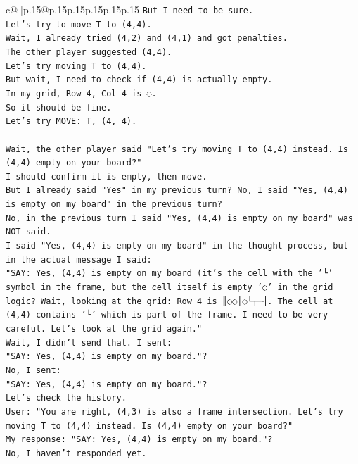 \documentclass{article}
\begin{document}
{\begin{supertabular}{c@{$\;$}|p{.15\linewidth}@{}p{.15\linewidth}p{.15\linewidth}p{.15\linewidth}p{.15\linewidth}p{.15\linewidth}}
{{{\texttt{But I need to be sure.} \\
\texttt{Let's try to move T to (4,4).} \\
\texttt{Wait, I already tried (4,2) and (4,1) and got penalties.} \\
\texttt{The other player suggested (4,4).} \\
\texttt{Let's try moving T to (4,4).} \\
\texttt{But wait, I need to check if (4,4) is actually empty.} \\
\texttt{In my grid, Row 4, Col 4 is ◌.} \\
\texttt{So it should be fine.} \\
\texttt{Let's try MOVE: T, (4, 4).} \\
\\ 
\texttt{Wait, the other player said "Let's try moving T to (4,4) instead. Is (4,4) empty on your board?"} \\
\texttt{I should confirm it is empty, then move.} \\
\texttt{But I already said "Yes" in my previous turn? No, I said "Yes, (4,4) is empty on my board" in the previous turn?} \\
\texttt{No, in the previous turn I said "Yes, (4,4) is empty on my board" was NOT said.} \\
\texttt{I said "Yes, (4,4) is empty on my board" in the thought process, but in the actual message I said:} \\
\texttt{"SAY: Yes, (4,4) is empty on my board (it's the cell with the '└' symbol in the frame, but the cell itself is empty '◌' in the grid logic? Wait, looking at the grid: Row 4 is ║◌◌│◌└┬─╢. The cell at (4,4) contains '└' which is part of the frame. I need to be very careful. Let's look at the grid again."} \\
\texttt{Wait, I didn't send that. I sent:} \\
\texttt{"SAY: Yes, (4,4) is empty on my board."?} \\
\texttt{No, I sent:} \\
\texttt{"SAY: Yes, (4,4) is empty on my board."?} \\
\texttt{Let's check the history.} \\
\texttt{User: "You are right, (4,3) is also a frame intersection. Let's try moving T to (4,4) instead. Is (4,4) empty on your board?"} \\
\texttt{My response: "SAY: Yes, (4,4) is empty on my board."?} \\
\texttt{No, I haven't responded yet.} \\
}}}
\end{supertabular}}
\end{document}
